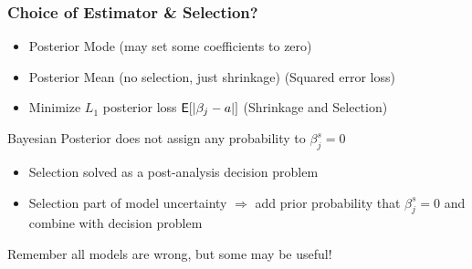 \documentclass[handout]{beamer}
\begin{document}
\begin{frame}
  \frametitle{Choice of Estimator \& Selection?}

  \begin{itemize}
  \item Posterior Mode (may set some coefficients to zero) \pause
  \item Posterior Mean (no selection, just shrinkage) (Squared error loss)
  \item Minimize $L_1$ posterior loss  $\textsf{E}[|\beta_j - a |]$  (Shrinkage and Selection) \pause
  \end{itemize}
  Bayesian Posterior does not assign any probability to $\beta^s_j = 0$ \pause

  \begin{itemize}
  \item Selection solved as a post-analysis decision problem \pause
  \item Selection part of model uncertainty $\Rightarrow$ add prior \pause
    probability that $\beta^s_j = 0$  and combine with decision problem
  \end{itemize}
Remember all models are wrong, but some may be useful!
\end{frame}
\end{document}
